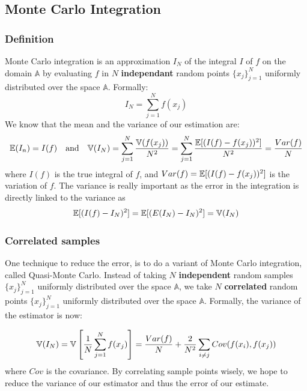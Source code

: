 \documentclass{classeENS}
\begin{document}
\subsection{Monte Carlo Integration}

\subsubsection{Definition}\label{montecarlo}

Monte Carlo integration is an approximation $I_N$ of the integral 
$I$ of $f$ on the domain $\mathbb A$ by evaluating $f$ in $N$ \textbf{independant} 
random points $\{x_j\}_{j=1}^N$ uniformly distributed over the 
space $\mathbb A$. Formally:
\begin{equation}
    \label{eq:montecarlo}
    I_N = \sum_{j=1}^N f(x_j)
\end{equation}
We know that the mean and the variance of our estimation are:
\begin{equation}
    \mathbb E(I_n) = I(f) \quad \text{and} \quad 
    \mathbb V(I_N) = \sum_{j=1}^N \frac{\mathbb V(f(x_j))}{N^2} = \sum_{j=1}^N\frac{\mathbb E[(I(f) - f(x_j))^2]}{N^2} = \frac{Var(f)}{N}
\end{equation}
where $I(f)$ is the true integral of $f$, and $Var(f)=\mathbb E[(I(f) - f(x_j))^2]$ is the variation of $f$. 
The variance is really important as the error in the integration is directly 
linked to the variance as
\begin{align*}   \label{eq:variance}
    \mathbb E[(I(f) - I_N)^2] = \mathbb E[(E(I_N) - I_N)^2] = \mathbb V(I_N)
\end{align*}

\subsubsection{Correlated samples}

One technique to reduce the error, is to do a variant of Monte Carlo integration, 
called Quasi-Monte Carlo. Instead of taking $N$ \textbf{independent} random samples 
$\{x_j\}_{j=1}^N$ 
uniformly distributed over the space $\mathbb A$, we take $N$ \textbf{correlated} random 
points $\{x_j\}_{j=1}^N$ uniformly distributed over the space $\mathbb A$. Formally, 
the variance of the estimator is now:
 
\[ \mathbb V(I_N) = \mathbb V\left [\frac{1}{N}\sum_{j=1}^N f(x_j) \right ] = \frac{Var(f)}{N} + \frac{2}{N^2}\sum_{i\neq j} Cov(f(x_i),f(x_j)) \]
where $Cov$ is the covariance.
By correlating sample points wisely, we hope to reduce the variance of our estimator and 
thus the error of our estimate. 
\end{document}
